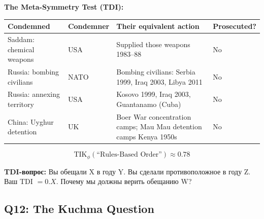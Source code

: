 \documentclass[11pt,a4paper]{article}
\theoremstyle{definition}
\theoremstyle{remark}
\newcommand{\TIKpharisee}{\text{TIK}_{\phi}}    %
\begin{document}
\begin{tcolorbox}[enhanced, breakable,
  colback=gray!5, colframe=black!60,
  title={\textbf{Q11 — Historical Mirror:}
    \textit{You condemned Dictator X for action Y.
    Your nation did Y in decade Z.}},
  fonttitle=\bfseries, boxrule=1pt]

\textbf{The Meta-Symmetry Test (TDI):}\\[0.2cm]
\begin{center}
\begin{tabular}{@{}p{}p{}
  p{}p{}@{}}
\toprule
\textbf{Condemned} & \textbf{Condemner} &
\textbf{Their equivalent action} & \textbf{Prosecuted?} \\
\midrule
Saddam: chemical weapons
  & USA
  & Supplied those weapons 1983--88
  & No \\[3pt]
Russia: bombing civilians
  & NATO
  & Bombing civilians: Serbia 1999, Iraq 2003, Libya 2011
  & No \\[3pt]
Russia: annexing territory
  & USA
  & Kosovo 1999, Iraq 2003, Guantanamo (Cuba)
  & No \\[3pt]
China: Uyghur detention
  & UK
  & Boer War concentration camps;
    Mau Mau detention camps Kenya 1950s
  & No \\
\bottomrule
\end{tabular}
\end{center}

\vspace{0.2cm}
\[
  \TIKpharisee(\text{``Rules-Based Order''})
  \approx 0.78
\]

\foreignlanguage{russian}{
\textbf{TDI-вопрос:}
Вы обещали X в году Y. Вы сделали противоположное в году Z.
Ваш TDI $= 0.X$.
Почему мы должны верить обещанию W?
}
\end{tcolorbox}

\subsection{Q12: The Kuchma Question}
\label{sec:q12}
\end{document}
